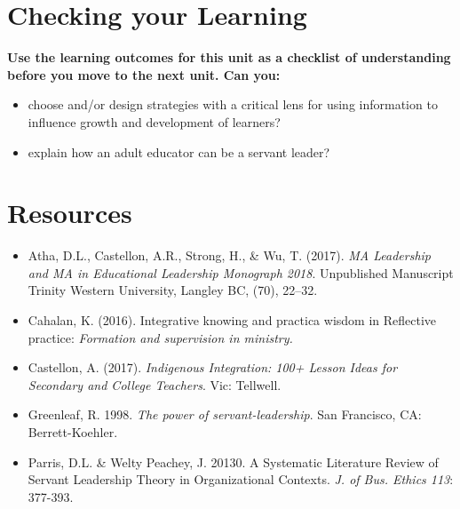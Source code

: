 \documentclass[
]{book}
\providecommand{\tightlist}{%
  \setlength{\itemsep}{0pt}\setlength{\parskip}{0pt}}
\begin{document}
\hypertarget{checking-your-learning-6}{%
\section*{Checking your Learning}\label{checking-your-learning-6}}

\begin{progress}
\textbf{Use the learning outcomes for this unit as a checklist of understanding before you move to the next unit. Can you:}

\begin{itemize}
\tightlist
\item
  choose and/or design strategies with a critical lens for using information to influence growth and development of learners?\\
\item
  explain how an adult educator can be a servant leader?
\end{itemize}
\end{progress}

\hypertarget{resources-1}{%
\section*{Resources}\label{resources-1}}

\begin{itemize}
\tightlist
\item
  Atha, D.L., Castellon, A.R., Strong, H., \& Wu, T. (2017). \emph{MA Leadership and MA in Educational Leadership Monograph 2018}. Unpublished Manuscript Trinity Western University, Langley BC, (70), 22--32.\\
\item
  Cahalan, K. (2016). Integrative knowing and practica wisdom in Reflective practice: \emph{Formation and supervision in ministry.}\\
\item
  Castellon, A. (2017). \emph{Indigenous Integration: 100+ Lesson Ideas for Secondary and College Teachers}. Vic: Tellwell.\\
\item
  Greenleaf, R. 1998. \emph{The power of servant-leadership}. San Francisco, CA: Berrett-Koehler.\\
\item
  Parris, D.L. \& Welty Peachey, J. 20130. A Systematic Literature Review of Servant Leadership Theory in Organizational Contexts. \emph{J. of Bus. Ethics 113}: 377-393.
\end{itemize}
\end{document}
